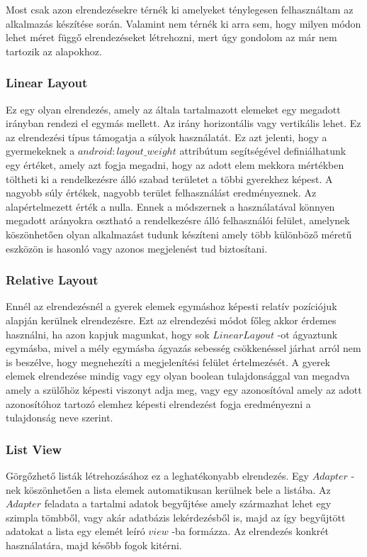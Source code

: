 \documentclass[12pt]{report}
\theoremstyle{definition}
\begin{document}
	Most csak azon elrendezésekre térnék ki amelyeket ténylegesen felhasználtam az alkalmazás készítése során. Valamint nem térnék ki arra sem, hogy milyen módon lehet méret függő elrendezéseket létrehozni, mert úgy gondolom az már nem tartozik az alapokhoz.
	
	\subsubsection{Linear Layout}
	Ez egy olyan elrendezés, amely az általa tartalmazott elemeket egy megadott irányban rendezi el egymás mellett. Az irány horizontális vagy vertikális lehet. Ez az elrendezési típus támogatja a súlyok használatát. Ez azt jelenti, hogy a gyermekeknek a $android:layout\_weight$ attribútum segítségével definiálhatunk egy értéket, amely azt fogja megadni, hogy az adott elem mekkora mértékben töltheti ki a rendelkezésre álló szabad területet a többi gyerekhez képest. A nagyobb súly értékek, nagyobb terület felhasználást eredményeznek. Az alapértelmezett érték a nulla. Ennek a módszernek a használatával könnyen megadott arányokra osztható a rendelkezésre álló felhasználói felület, amelynek köszönhetően olyan alkalmazást tudunk készíteni amely több különböző méretű eszközön is hasonló vagy azonos megjelenést tud biztosítani.
	
	\subsubsection{Relative Layout}
	Ennél az elrendezésnél a gyerek elemek egymáshoz képesti relatív pozíciójuk alapján kerülnek elrendezésre. Ezt az elrendezési módot főleg akkor érdemes használni, ha azon kapjuk magunkat, hogy sok $LinearLayout$ -ot ágyaztunk egymásba, mivel a mély egymásba ágyazás sebesség csökkenéssel járhat arról nem is beszélve, hogy megnehezíti a megjelenítési felület értelmezését. A gyerek elemek elrendezése mindig vagy egy olyan boolean tulajdonsággal van megadva amely a szülőhöz képesti viszonyt adja meg, vagy egy azonosítóval amely az adott azonosítóhoz tartozó elemhez képesti elrendezést fogja eredményezni a tulajdonság neve szerint.
	
	\subsubsection{List View}
	Görgőzhető listák létrehozásához ez a leghatékonyabb elrendezés. Egy $Adapter$ -nek köszönhetően a lista elemek automatikusan kerülnek bele a listába. Az $Adapter$ feladata a tartalmi adatok begyűjtése amely származhat lehet egy szimpla tömbből, vagy akár adatbázis lekérdezésből is, majd az így begyűjtött adatokat a lista egy elemét leíró $view$ -ba formázza. Az elrendezés konkrét használatára, majd később fogok kitérni.
	
\end{document}
